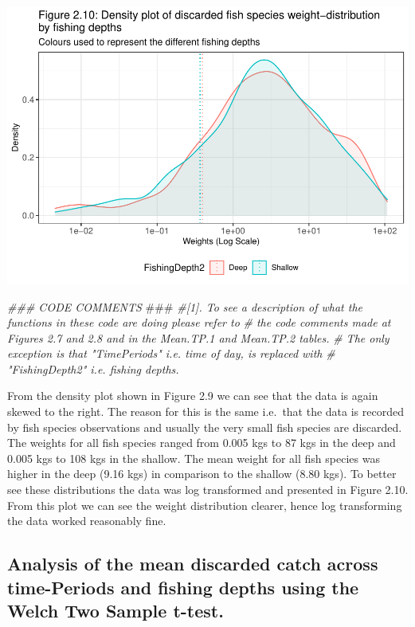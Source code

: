 \documentclass[
]{book}
\newenvironment{Shaded}{\begin{snugshade}}{\end{snugshade}}
\newcommand{\AlertTok}[1]{\textcolor[rgb]{0.94,0.16,0.16}{#1}}
\newcommand{\CommentTok}[1]{\textcolor[rgb]{0.56,0.35,0.01}{\textit{#1}}}
\begin{document}
\begin{center}\includegraphics{bookdown-demo_files/figure-latex/unnamed-chunk-20-2} \end{center}

\begin{Shaded}
\begin{Highlighting}[]
\CommentTok{### CODE COMMENTS }\AlertTok{###}
\CommentTok{#[1]. To see a description of what the functions in these code are doing please refer to }
\CommentTok{#     the code comments made at Figures 2.7 and 2.8 and in the Mean.TP.1 and Mean.TP.2 tables.}
\CommentTok{#     The only exception is that "TimePeriods" i.e. time of day, is replaced with }
\CommentTok{#     "FishingDepth2" i.e. fishing depths. }
\end{Highlighting}
\end{Shaded}

From the density plot shown in Figure 2.9 we can see that the data is again skewed to the right. The reason for this is the same i.e.~that the data is recorded by fish species observations and usually the very small fish species are discarded. The weights for all fish species ranged from 0.005 kgs to 87 kgs in the deep and 0.005 kgs to 108 kgs in the shallow. The mean weight for all fish species was higher in the deep (9.16 kgs) in comparison to the shallow (8.80 kgs). To better see these distributions the data was log transformed and presented in Figure 2.10. From this plot we can see the weight distribution clearer, hence log transforming the data worked reasonably fine.

\hypertarget{analysis-of-the-mean-discarded-catch-across-time-periods-and-fishing-depths-using-the-welch-two-sample-t-test.}{%
\subsection{\texorpdfstring{Analysis of the mean discarded catch across time-Periods and fishing depths using the \textbf{Welch Two Sample t-test}.}{Analysis of the mean discarded catch across time-Periods and fishing depths using the Welch Two Sample t-test.}}\label{analysis-of-the-mean-discarded-catch-across-time-periods-and-fishing-depths-using-the-welch-two-sample-t-test.}}
\end{document}
